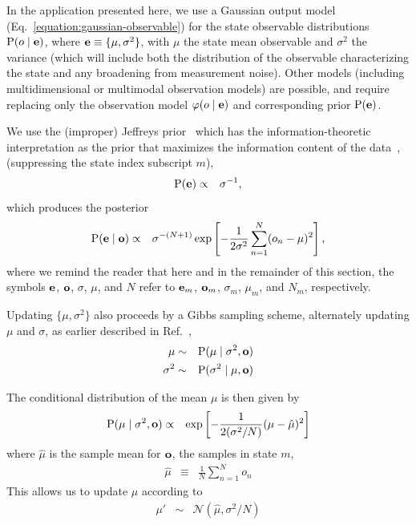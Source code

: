 \documentclass[aps,pre,twocolumn,superscriptaddress,nofootinbib,longbibliography]{revtex4-1}
\newcommand{\bfm}[1]{{\bf #1}}
\renewcommand{\Pr}{\mathrm{P}}
\begin{document}
{In the application presented here, we use a Gaussian output model (Eq.~\ref{equation:gaussian-observable}) 
for the state observable distributions $\Pr(o \mid \bfm{e})$, where $\bfm{e} \equiv \{\mu, \sigma^2\}$, with $\mu$ the state mean observable and $\sigma^2$ the variance (which will include both the distribution of the observable characterizing the state and any broadening from measurement noise).
Other models (including multidimensional or multimodal observation models) are possible, and require replacing only the observation model $\varphi(o \mid \bfm{e})$ and corresponding prior $\Pr(\bfm{e})$.

We use the (improper) Jeffreys prior~\cite{jeffreys:proc-royal-soc-a:1946:jeffreys-prior} which has the information-theoretic interpretation as the prior that maximizes the information content of the data~\cite{goyal:bayesian-inference-book:2005:jeffreys-prior}, (suppressing the state index subscript $m$),
\begin{eqnarray}
\Pr(\bfm{e}) &\propto& \sigma^{-1} \label{equation:emission-parameter-prior} ,
\end{eqnarray}
which produces the posterior
\begin{eqnarray}
\Pr(\bfm{e} \mid \bfm{o}) &\propto& \sigma^{-(N+1)} \exp\left[-\frac{1}{2 \sigma^2} \sum_{n=1}^N (o_n - \mu)^2 \right] ,
\end{eqnarray}
where we remind the reader that here and in the remainder of this section, the symbols $\bfm{e}$, $\bfm{o}$, $\sigma$, $\mu$, and $N$ refer to $\bfm{e}_m$, $\bfm{o}_m$, $\sigma_m$, $\mu_m$, and $N_m$, respectively.

Updating $\{\mu, \sigma^2\}$ also proceeds by a Gibbs sampling scheme, alternately updating $\mu$ and $\sigma$, as earlier described in Ref.~\citep{chodera-noe:jcp:2011:observable-sampling},
\begin{eqnarray}
\mu &\sim& \Pr(\mu \mid \sigma^2, \bfm{o}) \nonumber \\
\sigma^2 &\sim& \Pr(\sigma^2 \mid \mu, \bfm{o})
\end{eqnarray}

The conditional distribution of the mean $\mu$ is then given by
\begin{eqnarray}
\Pr(\mu \mid \sigma^2, \bfm{o}) &\propto& \exp\left[-\frac{1}{2 (\sigma^2/N)} (\mu - \hat{\mu})^2 \right] 
\end{eqnarray}
where $\hat{\mu}$ is the sample mean for $\bfm{o}$, the samples in state $m$,
\begin{eqnarray}
\hat{\mu} &\equiv& \frac{1}{N} \sum_{n=1}^N o_n
\end{eqnarray}
This allows us to update $\mu$ according to 
\begin{eqnarray}
\mu' &\sim& \mathcal{N}(\hat{\mu}, \sigma^2 / N)
\end{eqnarray}

}
\end{document}
